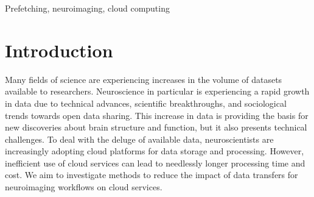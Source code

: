 \documentclass[conference]{IEEEtran}
\begin{document}
\begin{abstract}
  
  
\end{abstract}

\begin{IEEEkeywords}
Prefetching, neuroimaging, cloud computing
\end{IEEEkeywords}


\section{Introduction}




Many fields of science are experiencing increases in the volume of datasets available to researchers. Neuroscience in particular is experiencing a rapid growth in data due to technical advances, 
scientific breakthroughs, and sociological trends towards open data sharing. This increase in data is providing the basis for new discoveries about brain structure and function, but it also presents technical challenges. To deal with the deluge of available data, neuroscientists are increasingly adopting cloud platforms for data storage and processing. However, inefficient use of cloud services can lead
to needlessly longer processing time and cost. We aim to investigate
methods to reduce the impact of data transfers for
neuroimaging workflows on cloud services.
\end{document}
